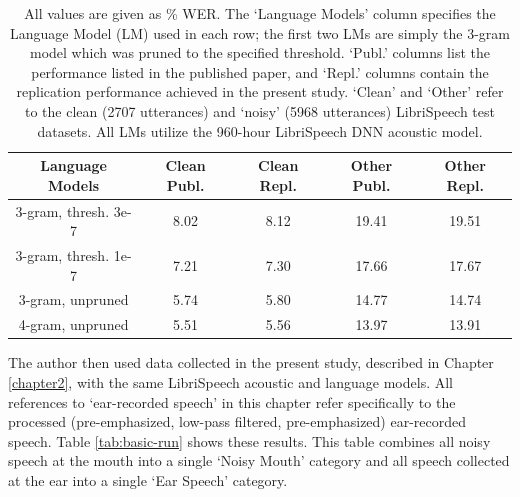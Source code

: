 \begin{table}[h]
\begin{center}
\begin{tabular}{| c || c | c | c | c |} \hline
Language Models & Clean Publ. & Clean Repl. & Other Publ. & Other Repl. \\ \hline\hline
3-gram, thresh. 3e-7 & 8.02 & 8.12 & 19.41 & 19.51 \\ \hline
3-gram, thresh. 1e-7 & 7.21 & 7.30 & 17.66 & 17.67 \\ \hline
3-gram, unpruned & 5.74 & 5.80 & 14.77 & 14.74 \\ \hline
4-gram, unpruned & 5.51 & 5.56 & 13.97 & 13.91 \\ \hline
\end{tabular}
\end{center}
\caption{All values are given as \% WER.  The `Language Models' column specifies the Language Model (LM) used in each row; the first two LMs are simply the 3-gram model which was pruned to the specified threshold.  `Publ.' columns list the performance listed in the published paper, and `Repl.' columns contain the replication performance achieved in the present study.  `Clean' and `Other' refer to the clean (2707 utterances) and `noisy' (5968 utterances) LibriSpeech test datasets. All LMs utilize the 960-hour LibriSpeech DNN acoustic model.}\label{tab:sanity-check}
\end{table}

The author then used data collected in the present study, described in Chapter \ref{chapter2}, with the same LibriSpeech acoustic and language models.  All references to `ear-recorded speech' in this chapter refer specifically to the processed (pre-emphasized, low-pass filtered, pre-emphasized) ear-recorded speech.  Table \ref{tab:basic-run} shows these results.  This table combines all noisy speech at the mouth into a single `Noisy Mouth' category and all speech collected at the ear into a single `Ear Speech' category.

